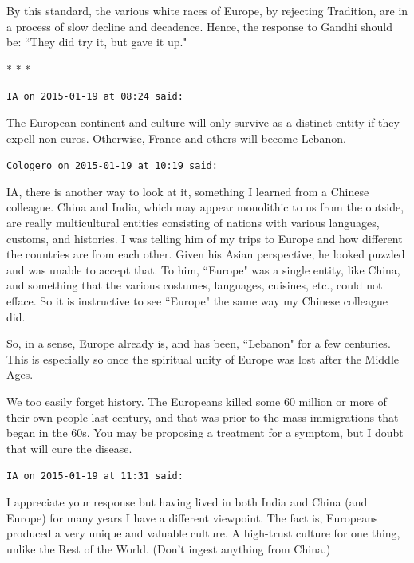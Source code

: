 By this standard, the various white races of Europe, by rejecting Tradition, are in a process of slow decline and decadence. Hence, the response to Gandhi should be: ``They did try it, but gave it up."




\begin{center}* * *\end{center}

\begin{footnotesize}\begin{sffamily}



\texttt{IA on 2015-01-19 at 08:24 said: }

The European continent and culture will only survive as a distinct entity if they expell non-euros. Otherwise, France and others will become Lebanon.


\hfill

\texttt{Cologero on 2015-01-19 at 10:19 said: }

IA, there is another way to look at it, something I learned from a Chinese colleague. China and India, which may appear monolithic to us from the outside, are really multicultural entities consisting of nations with various languages, customs, and histories. I was telling him of my trips to Europe and how different the countries are from each other. Given his Asian perspective, he looked puzzled and was unable to accept that. To him, ``Europe" was a single entity, like China, and something that the various costumes, languages, cuisines, etc., could not efface. So it is instructive to see ``Europe" the same way my Chinese colleague did.

So, in a sense, Europe already is, and has been, ``Lebanon" for a few centuries. This is especially so once the spiritual unity of Europe was lost after the Middle Ages.

We too easily forget history. The Europeans killed some 60 million or more of their own people last century, and that was prior to the mass immigrations that began in the 60s. You may be proposing a treatment for a symptom, but I doubt that will cure the disease.


\hfill

\texttt{IA on 2015-01-19 at 11:31 said: }

I appreciate your response but having lived in both India and China (and Europe) for many years I have a different viewpoint. The fact is, Europeans produced a very unique and valuable culture. A high-trust culture for one thing, unlike the Rest of the World. (Don't ingest anything from China.)


\end{sffamily}
\end{footnotesize}

